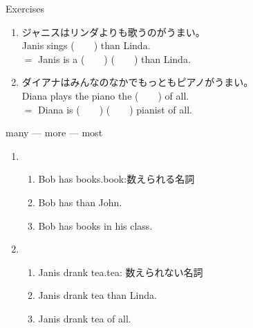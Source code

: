 \documentclass[aspectratio=169,xcolor={dvipsnames,table}]{beamer}
\begin{document}
\begin{frame}[plain]{Exercises}
\begin{enumerate}
 \item ジャニスはリンダよりも歌うのがうまい。\\
       Janis sings (~~~~) than Linda.\\
       $=$\,\,Janis is a  (~~~~)  (~~~~) than Linda.
 \item ダイアナはみんなのなかでもっともピアノがうまい。\\
       Diana plays the piano the (~~~~) of all.\\
       $=$\,\,Diana is (~~~~)  (~~~~) pianist of all.
\end{enumerate}
\end{frame}
\begin{frame}[plain]{many --- more --- most}
 \begin{enumerate}
  \item \begin{enumerate}
	 \item<1-> Bob has  books.\hfill{\scriptsize book:数えられる名詞}
	 \item<2-> Bob has  than John.
	 \item<3-> Bob has  books in his class.
	\end{enumerate}
  \item \begin{enumerate}
	 \item<4-> Janis drank  tea.\hfill{\scriptsize tea: 数えられない名詞}
	 \item<5-> Janis drank  tea than Linda.
	 \item<6-> Janis drank  tea of all. 

	\end{enumerate}
 \end{enumerate}

\end{frame}
\end{document}
